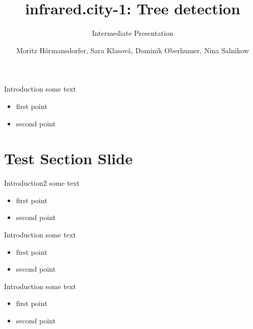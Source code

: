 \documentclass{beamer}
\title[Tree detection]{infrared.city-1: Tree detection}
\subtitle{Intermediate Presentation}
\author[Team Infrared-City-1]{Moritz Hörmansdorfer, Sara Klasová, Dominik Oberhumer, Nina Salnikow}
\date{}
\begin{document}
\begin{frame}
    \titlepage
\end{frame}

\begin{frame}{Introduction}
    some text
    \begin{itemize}
        \item first point
        \item second point
    \end{itemize}
\end{frame}

\section{Test Section Slide}

\begin{frame}{Introduction2}
    some text
    \begin{itemize}
        \item first point
        \item second point
    \end{itemize}
\end{frame}

\begin{frame}{Introduction}
    some text
    \begin{itemize}
        \item first point
        \item second point
    \end{itemize}
\end{frame}

\begin{frame}{Introduction}
    some text
    \begin{itemize}
        \item first point
        \item second point
    \end{itemize}
\end{frame}
\end{document}
